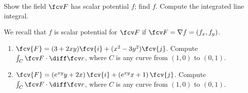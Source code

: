 Show the field $\fcv F$ has scalar potential $f$; find $f$. Compute the integrated line integral.

We recall that $f$ is scalar potential for $\fcv F$ if $\fcv F=\nabla f=\left(f_x,f_y\right)$.
\begin{enumerate}
\item  $\fcv{F} = (3+2xy)\fcv{i} + (x^2-3y^2) \fcv{j}$. Compute $\int_{C} \fcv F\cdot \diff \fcv r$, where $C$ is any curve from $(1,0)$ to $(0,1)$.
\item  $\fcv{F} = \left(e^{x y} y+2 x\right) \fcv{i} + \left( e^{x y} x+1\right) \fcv{j}$. Compute $\int_{C} \fcv F\cdot \diff \fcv r$, where $C$ is any curve from $(1,0)$ to $(0,1)$.

\end{enumerate}